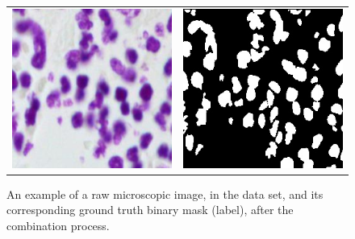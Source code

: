 \documentclass{article}
\begin{document}
\begin{figure}[ht]
\vskip 3mm
\begin{tabular}{ll}
\includegraphics[scale=0.40]{mlp-cw3-template/Figures/raw_nuclei.jpg}
&
\includegraphics[scale=0.56]{mlp-cw3-template/Figures/ground_truth_nuclei.jpg}
\end{tabular}
\caption{An example of a raw microscopic image, in the data set, and its corresponding ground truth binary mask (label), after the combination process.}
\label{fig:example_images}
\vskip 1mm
\end{figure}

\end{document}
